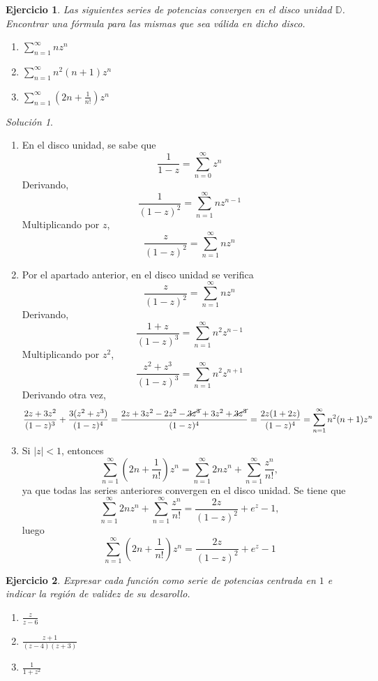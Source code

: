 \documentclass[11pt]{report}
\newcommand{\D}{\mathbb D}
\newcommand{\serie}[2][0]{\sum_{n=#1}^\infty #2}
\newtheorem{exercise}{Ejercicio}
\theoremstyle{remark}
\newtheorem*{resolution}{Solución}
\begin{document}
\begin{exercise}
Las siguientes series de potencias convergen en el disco unidad $\D$. Encontrar una fórmula para las mismas que sea válida en dicho disco.
\begin{enumerate}
    \item $\displaystyle \sum_{n=1}^\infty nz^n$
    \item $\displaystyle \sum_{n=1}^\infty n^2 (n+1)z^n$
    \item $\displaystyle \sum_{n=1}^\infty\left(2n+\frac{1}{n!}\right)z^n$
\end{enumerate}
\end{exercise}

\begin{resolution}
\hfill
\begin{enumerate}
    \item En el disco unidad, se sabe que
    \[\frac{1}{1-z} = \serie{z^n}\]
    Derivando,
    \[\frac{1}{(1-z)^2} = \serie[1]{nz^{n-1}}\]
    Multiplicando por $z$,
    \[\frac{z}{(1-z)^2} =\serie[1]{nz^n}\]
    \item Por el apartado anterior, en el disco unidad se verifica
    \[\frac{z}{(1-z)^2} = \sum_{n=1}^\infty nz^n\]
    Derivando,
    \[\frac{1+z}{(1-z)^3}= \sum_{n=1}^\infty n^2z^{n-1}\]
    Multiplicando por $z^2$,
    \[\frac{z^2+z^3}{(1-z)^3} = \sum_{n=1}^\infty n^2z^{n+1}\]
    Derivando otra vez,
    \[\frac{2z+3z^2}{(1-z)^3}+\frac{3(z^2+z^3)}{(1-z)^4} = \frac{2z+3z^2-2z^2-\cancel{3z^3}+3z^2+\cancel{3z^3}}{(1-z)^4}= \frac{2z(1+2z)}{(1-z)^4} = \sum_{n=1}^\infty n^2(n+1)z^{n}\]
    \item Si $|z|<1$, entonces
    \[\serie[1]{\left(2n+\frac{1}{n!}\right)z^n} = \serie[1]{2nz^n}+\serie[1]{\frac{z^n}{n!}},\]
    ya que todas las series anteriores convergen en el disco unidad. Se tiene que
    \[\serie[1]{2nz^n}+\serie[1]{\frac{z^n}{n!}} = \frac{2z}{(1-z)^2}+e^z-1,\]
    luego
    \[\serie[1]{\left(2n+\frac{1}{n!}\right)z^n} = \frac{2z}{(1-z)^2}+e^z-1\]
\end{enumerate}
\end{resolution}

\begin{exercise}
Expresar cada función como serie de potencias centrada en $1$ e indicar la región de validez de su desarollo.
\begin{enumerate}
    \item $\displaystyle \frac{z}{z-6}$
    \item $\displaystyle \frac{z+1}{(z-4)(z+3)}$
    \item $\displaystyle \frac{1}{1+z^2}$
\end{enumerate}
\end{exercise}
\end{document}
